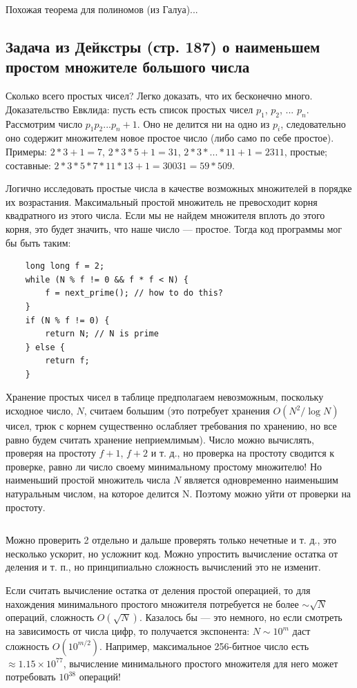\documentclass{book}
\begin{document}
Похожая теорема для полиномов (из Галуа)...

\subsection{Задача из Дейкстры (стр. 187) о наименьшем простом множителе большого числа}

Сколько всего простых чисел? Легко доказать, что их бесконечно много. Доказательство Евклида: пусть
есть список простых чисел $p_1$, $p_2$, ... $p_n$. Рассмотрим число $p_1 p_2 ... p_n + 1$. Оно
не делится ни на одно из $p_i$, следовательно оно содержит множителем новое простое число (либо само по себе
простое). Примеры: $2 *
3 + 1 = 7$, $2 * 3 * 5 + 1 = 31$, $2*3*...*11 + 1 = 2311$, простые; составные: $2 * 3 * 5 *
7 * 11 * 13 + 1 = 30031 = 59 * 509$.

Логично исследовать простые числа в качестве возможных множителей в порядке их возрастания.
Максимальный простой множитель не превосходит корня квадратного из этого числа. Если мы не найдем
множителя вплоть до этого корня, это будет значить, что наше число --- простое. Тогда код программы
мог бы быть таким:
\begin{verbatim}
    long long f = 2;
    while (N % f != 0 && f * f < N) {
        f = next_prime(); // how to do this?
    }
    if (N % f != 0) {
        return N; // N is prime
    } else {
        return f;
    }
\end{verbatim}
Хранение простых чисел в таблице предполагаем невозможным, поскольку исходное число, $N$, считаем
большим (это потребует хранения $O(N^2 / \log N)$ чисел, трюк с корнем существенно
ослабляет требования по хранению, но все равно будем считать хранение неприемлимым). Число можно
вычислять, проверяя на простоту $f + 1$, $f + 2$ и т. д., но проверка на простоту сводится к
проверке, равно ли число своему минимальному простому множителю! Но наименьший простой множитель
числа $N$ является одновременно наименьшим натуральным числом, на которое делится N. Поэтому можно
уйти от проверки на простоту.

\inputminted{cpp}{prime-factors.cpp}

Можно проверить 2 отдельно и дальше проверять только нечетные и т. д., это несколько ускорит, но
усложнит код. Можно упростить вычисление остатка от деления и т. п., но принципиально сложность
вычислений это не изменит.

Если считать вычисление остатка от деления простой операцией, то для нахождения минимального
простого множителя потребуется не более $\sim \sqrt{N}$ операций, сложность $O(\sqrt{N})$. Казалось
бы --- это немного, но если смотреть на зависимость от числа цифр, то получается экспонента: $N
\sim 10^m$ даст сложность $O(10^{m/2})$. Например, максимальное 256-битное число есть $\approx 1.15
\times 10^{77}$, вычисление минимального простого множителя для него может потребовать $10^{38}$
операций!
\end{document}
